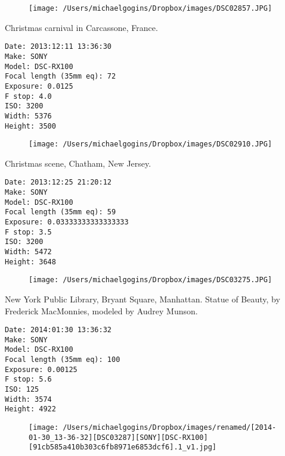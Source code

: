 \documentclass[11pt,letter,DIV=14,paper=landscape]{scrbook}
\begin{document}
\begin{figure}
\texttt{[image: /Users/michaelgogins/Dropbox/images/DSC02857.JPG]}
\end{figure}
    
\clearpage
\noindent Christmas carnival in Carcassone, France.
\noindent
\begin{lstlisting}
Date: 2013:12:11 13:36:30
Make: SONY
Model: DSC-RX100
Focal length (35mm eq): 72
Exposure: 0.0125
F stop: 4.0
ISO: 3200
Width: 5376
Height: 3500
\end{lstlisting}
\clearpage

\begin{figure}
\texttt{[image: /Users/michaelgogins/Dropbox/images/DSC02910.JPG]}
\end{figure}
    
\clearpage
\noindent Christmas scene, Chatham, New Jersey.
\noindent
\begin{lstlisting}
Date: 2013:12:25 21:20:12
Make: SONY
Model: DSC-RX100
Focal length (35mm eq): 59
Exposure: 0.03333333333333333
F stop: 3.5
ISO: 3200
Width: 5472
Height: 3648
\end{lstlisting}
\clearpage

\begin{figure}
\texttt{[image: /Users/michaelgogins/Dropbox/images/DSC03275.JPG]}
\end{figure}
    
\clearpage
\noindent New York Public Library, Bryant Square, Manhattan. Statue of Beauty, by Frederick MacMonnies, modeled by Audrey Munson.
\noindent
\begin{lstlisting}
Date: 2014:01:30 13:36:32
Make: SONY
Model: DSC-RX100
Focal length (35mm eq): 100
Exposure: 0.00125
F stop: 5.6
ISO: 125
Width: 3574
Height: 4922
\end{lstlisting}
\clearpage

\begin{figure}
\texttt{[image: /Users/michaelgogins/Dropbox/images/renamed/[2014-01-30\_13-36-32][DSC03287][SONY][DSC-RX100][91cb585a410b303c6fb8971e6853dcf6].1\_v1.jpg]}
\end{figure}
    
\end{document}

